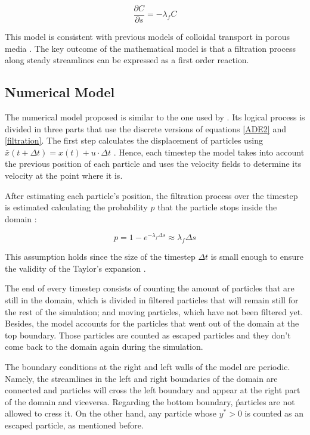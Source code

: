 \documentclass[draft,linenumbers]{agujournal2018}
\begin{document}
\begin{equation}
 \label{filtration}
 	\frac{\partial C}{\partial s} = -\lambda_f C
\end{equation}

This model is consistent with previous models of colloidal transport in porous media \citep{Domenico1998}. The key outcome of the mathematical model is that a filtration process along steady streamlines can be expressed as a first order reaction. 

\subsection{Numerical Model} \label{Numerical_model}

The numerical model proposed is similar to the one used by \citet{Packman2000}. Its logical process is divided in three parts that use the discrete versions of equations \ref{ADE2} and \ref{filtration}. The first step calculates the displacement of particles using $\bar{x}(t + \Delta t) = x(t)  + u \cdot \Delta t$ \citep{Li2017}. Hence, each timestep the model takes into account the previous position of each particle and uses the velocity fields to determine its velocity at the point where it is. 

After estimating each particle's position, the filtration process over the timestep is estimated calculating the probability $p$ that the particle stops inside the domain \citep{Prickett1981}:

\begin{equation}
\label{Filt_disc}
	p = 1 - e^{-\lambda_f \Delta s} \approx \lambda_{f} \Delta s
\end{equation}

This assumption holds since the size of the timestep $\Delta t$ is small enough to ensure the validity of the Taylor's expansion \citep{Li2017}.

The end of every timestep consists of counting the amount of particles that are still in the domain, which is divided in filtered particles that will remain still for the rest of the simulation; and moving particles, which have not been filtered yet. Besides, the model accounts for the particles that went out of the domain at the top boundary. Those particles are counted as escaped particles and they don't come back to the domain again during the simulation.

The boundary conditions at the right and left walls of the model are periodic. Namely, the streamlines in the left and right boundaries of the domain are connected and particles will cross the left boundary and appear at the right part of the domain and viceversa. Regarding the bottom boundary, ṕarticles are not allowed to cress it. On the other hand, any particle whose $y^* > 0$ is counted as an escaped particle, as mentioned before. 
\end{document}
